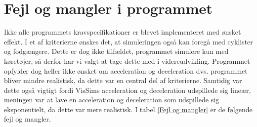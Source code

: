 \section{Fejl og mangler i programmet}
Ikke alle programmets kravspecifikationer er blevet implementeret med ønsket effekt. I et af kriterierne ønskes det, at simuleringen også kan foregå med cyklister og fodgængere. Dette er dog ikke tilfældet, programmet simulere kun med køretøjer, så derfor har vi valgt at tage dette med i videreudvikling. Programmet opfylder dog heller ikke ønsket om acceleration og deceleration dvs. programmet bliver mindre realistisk, da dette var en central del af kriterierne. Samtidig var dette også vigtigt fordi VisSims acceleration og deceleration udspillede sig lineær, meningen var at lave en acceleration og deceleration som udspillede sig eksponentielt, da dette var mere realistisk. I tabel \ref{Fejl og mangler} er de følgende fejl og mangler.



